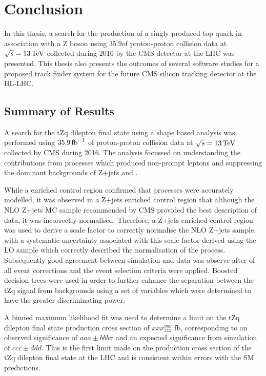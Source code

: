 \chapter{Conclusion}\label{chapter:conclusion}
In this thesis, a search for the production of a singly produced top quark in association with a Z boson using $35.9$\fbinv of proton-proton collision data at $\sqrt{s} = 13\,\text{Te\hspace{-.08em}V}$ collected during 2016 by the CMS detector at the LHC was presented.
This thesis also presents the outcomes of several software studies for a proposed track finder system for the future CMS silicon tracking detector at the HL-LHC.

\section{Summary of Results}
A search for the tZq dilepton final state using a shape based analysis was performed using $35.9\mbox{\ensuremath{\,\text{fb}^\text{$-$1}}}$ of proton-proton collision data at $\sqrt{s} = 13\,\text{Te\hspace{-.08em}V}$ collected by CMS during 2016.
The analysis focussed on understanding the contributions from processes which produced non-prompt leptons and suppressing the dominant backgrounds of Z+jets and \ttbar.

While a \ttbar enriched control region confirmed that \ttbar processes were accurately modelled, it was observed in a Z+jets enriched control region that although the NLO Z+jets MC sample recommended by CMS provided the best description of data, it was incorrectly normalised.
Therefore, a Z+jets enriched control region was used to derive a scale factor to correctly normalise the NLO Z+jets sample, with a systematic uncertainty associated with this scale factor derived using the LO sample which correctly described the normalisation of the process.
Subsequently good agreement between simulation and data was observe after of all event corrections and the event selection criteria were applied. 
Boosted decision trees were used in order to further enhance the separation between the tZq signal from backgrounds using a set of variables which were determined to have the greater discriminating power.

A binned maximum likelihood fit was used to determine a limit on the tZq dilepton final state production cross section of $xxx^{yyy}_{zzz}$ fb, corresponding to an observed significance of $aaa \pm bbb \sigma$ and an expected significance from simulation of $ccc \pm ddd$. 
This is the first limit made on the production cross section of the tZq dilepton final state at the LHC and is consistent within errors with the SM predictions.

